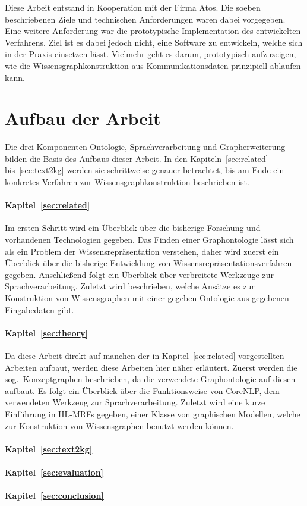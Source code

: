 Diese Arbeit entstand in Kooperation mit der Firma Atos.
Die soeben beschriebenen Ziele und technischen Anforderungen waren dabei vorgegeben.
Eine weitere Anforderung war die prototypische Implementation des entwickelten Verfahrens.
Ziel ist es dabei jedoch nicht, eine Software zu entwickeln, welche sich in der Praxis einsetzen lässt.
Vielmehr geht es darum, prototypisch aufzuzeigen, wie die Wissensgraphkonstruktion aus Kommunikationsdaten prinzipiell ablaufen kann.

\section{Aufbau der Arbeit}%
\label{sec:intro:structure}

Die drei Komponenten Ontologie, Sprachverarbeitung und Grapherweiterung bilden die Basis des Aufbaus dieser Arbeit.
In den Kapiteln~\ref{sec:related} bis~\ref{sec:text2kg} werden sie schrittweise genauer betrachtet, bis am Ende ein konkretes Verfahren zur Wissensgraphkonstruktion beschrieben ist.

\paragraph{Kapitel~\ref{sec:related}}
Im ersten Schritt wird ein Überblick über die bisherige Forschung und vorhandenen Technologien gegeben.
Das Finden einer Graphontologie lässt sich als ein Problem der Wissensrepräsentation verstehen, daher wird zuerst ein Überblick über die bisherige Entwicklung von Wissensrepräsentationsverfahren gegeben.
Anschließend folgt ein Überblick über verbreitete Werkzeuge zur Sprachverarbeitung.
Zuletzt wird beschrieben, welche Ansätze es zur Konstruktion von Wissensgraphen mit einer gegeben Ontologie aus gegebenen Eingabedaten gibt.

\paragraph{Kapitel~\ref{sec:theory}}
Da diese Arbeit direkt auf manchen der in Kapitel~\ref{sec:related} vorgestellten Arbeiten aufbaut, werden diese Arbeiten hier näher erläutert.
Zuerst werden die sog.\ Konzeptgraphen beschrieben, da die verwendete Graphontologie auf diesen aufbaut.
Es folgt ein Überblick über die Funktionsweise von CoreNLP, dem verwendeten Werkzeug zur Sprachverarbeitung.
Zuletzt wird eine kurze Einführung in HL-MRFs gegeben, einer Klasse von graphischen Modellen, welche zur Konstruktion von Wissensgraphen benutzt werden können.

\paragraph{Kapitel~\ref{sec:text2kg}}

\paragraph{Kapitel~\ref{sec:evaluation}}

\paragraph{Kapitel~\ref{sec:conclusion}}
